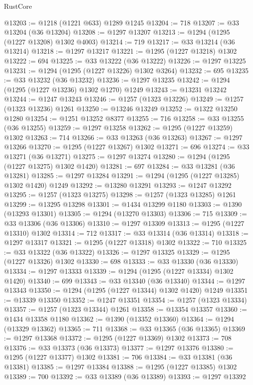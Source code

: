 \begin{lexlean}{RustCore}
\begin{coremodule}
@13203 := @1218 (@1221 @633) @1289 @1245
@13204 := 718
@13207 := @33 @13204 (@36 @13204)
@13208 := @1297 @13207
@13213 := @1294 (@1295 (@1227 @13208) @1302 @4003)
@13214 := 719
@13217 := @33 @13214 (@36 @13214)
@13218 := @1297 @13217
@13221 := @1295 (@1227 @13218) @1302
@13222 := 694
@13225 := @33 @13222 (@36 @13222)
@13226 := @1297 @13225
@13231 := @1294 (@1295 (@1227 @13226) @1302 @3264)
@13232 := 695
@13235 := @33 @13232 (@36 @13232)
@13236 := @1297 @13235
@13242 := @1294 (@1295 (@1227 @13236) @1302 @1270) @1249
@13243 := @13231 @13242
@13244 := @1247 @13243
@13246 := @1257 (@1323 @13226)
@13249 := @1257 (@1323 @13236) @1261
@13250 := @13246 @13249
@13252 := @1322 @13250 @1280
@13254 := @1251 @13252 @8377
@13255 := 716
@13258 := @33 @13255 (@36 @13255)
@13259 := @1297 @13258
@13262 := @1295 (@1227 @13259) @1302
@13263 := 714
@13266 := @33 @13263 (@36 @13263)
@13267 := @1297 @13266
@13270 := @1295 (@1227 @13267) @1302
@13271 := 696
@13274 := @33 @13271 (@36 @13271)
@13275 := @1297 @13274
@13280 := @1294 (@1295 (@1227 @13275) @1302 @1420)
@13281 := 697
@13284 := @33 @13281 (@36 @13281)
@13285 := @1297 @13284
@13291 := @1294 (@1295 (@1227 @13285) @1302 @1420) @1249
@13292 := @13280 @13291
@13293 := @1247 @13292
@13295 := @1257 (@1323 @13275)
@13298 := @1257 (@1323 @13285) @1261
@13299 := @13295 @13298
@13301 := @1434 @13299 @1180
@13303 := @1390 (@13293 @13301)
@13305 := @1294 (@13270 @13303)
@13306 := 715
@13309 := @33 @13306 (@36 @13306)
@13310 := @1297 @13309
@13313 := @1295 (@1227 @13310) @1302
@13314 := 712
@13317 := @33 @13314 (@36 @13314)
@13318 := @1297 @13317
@13321 := @1295 (@1227 @13318) @1302
@13322 := 710
@13325 := @33 @13322 (@36 @13322)
@13326 := @1297 @13325
@13329 := @1295 (@1227 @13326) @1302
@13330 := 698
@13333 := @33 @13330 (@36 @13330)
@13334 := @1297 @13333
@13339 := @1294 (@1295 (@1227 @13334) @1302 @1420)
@13340 := 699
@13343 := @33 @13340 (@36 @13340)
@13344 := @1297 @13343
@13350 := @1294 (@1295 (@1227 @13344) @1302 @1420) @1249
@13351 := @13339 @13350
@13352 := @1247 @13351
@13354 := @1257 (@1323 @13334)
@13357 := @1257 (@1323 @13344) @1261
@13358 := @13354 @13357
@13360 := @1434 @13358 @1180
@13362 := @1390 (@13352 @13360)
@13364 := @1294 (@13329 @13362)
@13365 := 711
@13368 := @33 @13365 (@36 @13365)
@13369 := @1297 @13368
@13372 := @1295 (@1227 @13369) @1302
@13373 := 708
@13376 := @33 @13373 (@36 @13373)
@13377 := @1297 @13376
@13380 := @1295 (@1227 @13377) @1302
@13381 := 706
@13384 := @33 @13381 (@36 @13381)
@13385 := @1297 @13384
@13388 := @1295 (@1227 @13385) @1302
@13389 := 700
@13392 := @33 @13389 (@36 @13389)
@13393 := @1297 @13392

\end{coremodule}
\end{lexlean}
